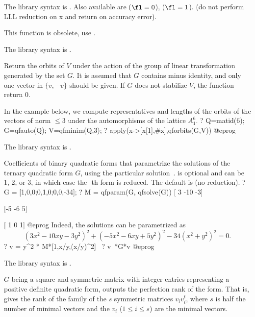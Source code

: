 The library syntax is .
Also available are
 ($\fl=0$),
 ($\fl=1$).
 (do not perform LLL
reduction on x and return  on accuracy error).

\label{se:qfnorm}
This function is obsolete, use .

The library syntax is .

\label{se:qforbits}
Return the orbits of $V$ under the action of the group
of linear transformation generated by the set $G$.
It is assumed that $G$ contains minus identity, and only one vector
in $\{v, -v\}$ should be given.
If $G$ does not stabilize $V$, the function return $0$.

In the example below, we compute representatives and lengths of the orbits of
the vectors of norm $\leq 3$ under the automorphisms of the lattice $A_1^6$.
\bprog
?  Q=matid(6); G=qfauto(Q); V=qfminim(Q,3);
?  apply(x->[x[1],#x],qforbits(G,V))
@eprog

The library syntax is .

\label{se:qfparam}
Coefficients of binary quadratic forms that parametrize the
solutions of the ternary quadratic form $G$, using the particular
solution~.
\fl is optional and can be 1, 2, or 3, in which case the \fl-th form is
reduced. The default is  (no reduction).
\bprog
? G = [1,0,0;0,1,0;0,0,-34];
? M = qfparam(G, qfsolve(G))
[ 3 -10 -3]

[-5  -6  5]

[ 1   0  1]
@eprog
Indeed, the solutions can be parametrized as
$$(3x^2 - 10xy - 3y^2)^2  + (-5x^2 - 6xy + 5y^2)^2 -34(x^2 + y^2)^2 = 0.$$
\bprog
? v = y^2 * M*[1,x/y,(x/y)^2]~
? v~*G*v
@eprog

The library syntax is .

\label{se:qfperfection}
$G$ being a square and symmetric matrix with
integer entries representing a positive definite quadratic form, outputs the
perfection rank of the form. That is, gives the rank of the family of the $s$
symmetric matrices $v_iv_i^t$, where $s$ is half the number of minimal
vectors and the $v_i$ ($1\le i\le s$) are the minimal vectors.

